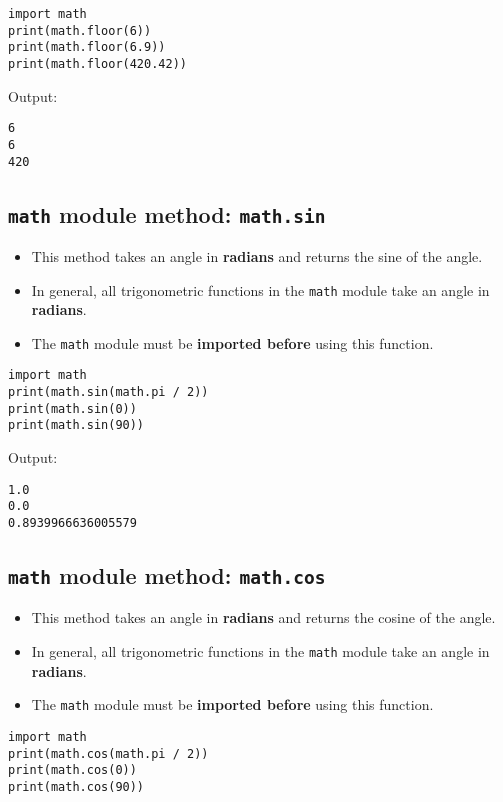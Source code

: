 \documentclass[11pt]{article}
\begin{document}
\begin{verbatim}
import math
print(math.floor(6))
print(math.floor(6.9))
print(math.floor(420.42))
\end{verbatim}

 \noindent Output:

\label{orgc05e30a}
\begin{verbatim}
6
6
420
\end{verbatim}
\subsection{\texttt{math} module method: \texttt{math.sin}}
\label{sec:org961acee}
\begin{itemize}
\item This method takes an angle in \textbf{radians} and returns the sine of the angle.
\item In general, all trigonometric functions in the \texttt{math} module take an angle in \textbf{radians}.
\item The \texttt{math} module must be \textbf{imported before} using this function.
\end{itemize}

\begin{verbatim}
import math
print(math.sin(math.pi / 2))
print(math.sin(0))
print(math.sin(90))
\end{verbatim}

 \noindent Output:

\label{org8bd4389}
\begin{verbatim}
1.0
0.0
0.8939966636005579
\end{verbatim}
\subsection{\texttt{math} module method: \texttt{math.cos}}
\label{sec:org6dbe66d}
\begin{itemize}
\item This method takes an angle in \textbf{radians} and returns the cosine of the angle.
\item In general, all trigonometric functions in the \texttt{math} module take an angle in \textbf{radians}.
\item The \texttt{math} module must be \textbf{imported before} using this function.
\end{itemize}

\begin{verbatim}
import math
print(math.cos(math.pi / 2))
print(math.cos(0))
print(math.cos(90))
\end{verbatim}
\end{document}
